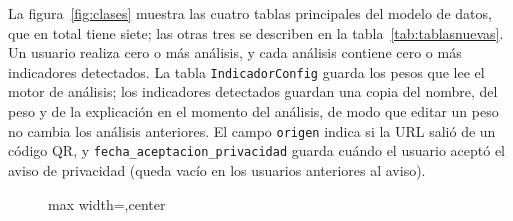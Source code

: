\documentclass[journal,onecolumn,12pt,draftclsnofoot]{IEEEtran}
\begin{document}
La figura~\ref{fig:clases} muestra las cuatro tablas principales del modelo de datos, que en total tiene siete; las otras tres se describen en la tabla~\ref{tab:tablasnuevas}. Un usuario realiza cero o más análisis, y cada análisis contiene cero o más indicadores detectados. La tabla \texttt{IndicadorConfig} guarda los pesos que lee el motor de análisis; los indicadores detectados guardan una copia del nombre, del peso y de la explicación en el momento del análisis, de modo que editar un peso no cambia los análisis anteriores. El campo \texttt{origen} indica si la URL salió de un código QR, y \texttt{fecha\_aceptacion\_privacidad} guarda cuándo el usuario aceptó el aviso de privacidad (queda vacío en los usuarios anteriores al aviso).

\begin{figure}[htbp]
\centering
{}
\begin{adjustbox}{max width=\textwidth,center}
\end{adjustbox}
\end{figure}
\end{document}
